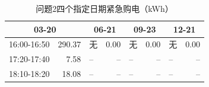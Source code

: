 \begin{table}[H]\centering\small\caption{问题2四个指定日期紧急购电（kWh）}\label{tab:q2e}
\begin{tabular}{lrlrlrlr}\toprule
\multicolumn{2}{c}{03-20} & \multicolumn{2}{c}{06-21} & \multicolumn{2}{c}{09-23} & \multicolumn{2}{c}{12-21}\\\midrule
16:00-16:50 & 290.37 & 无 & 0.00 & 无 & 0.00 & 无 & 0.00\\
17:20-17:40 & 7.58 & -- & -- & -- & -- & -- & --\\
18:10-18:20 & 18.08 & -- & -- & -- & -- & -- & --\\
\bottomrule\end{tabular}\end{table}
